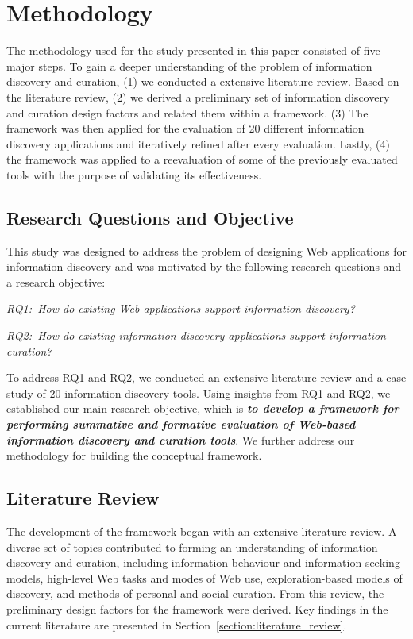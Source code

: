 \documentclass{sigchi}
\begin{document}
\section{Methodology}
\label{section:methodology}
The methodology used for the study presented in this paper consisted of five major steps. To gain a deeper understanding of the problem of information discovery and curation, (1) we conducted a extensive literature review. Based on the literature review, (2) we derived a preliminary set of information discovery and curation design factors and related them within a framework. (3) The framework was then applied for the evaluation of 20 different information discovery applications and iteratively refined after every evaluation. Lastly, (4) the framework was applied to a reevaluation of some of the previously evaluated tools with the purpose of validating its effectiveness. 

{\subsection{Research Questions and Objective}
This study was designed to address the problem of designing Web applications for information discovery and was motivated by the following research questions and a research objective:

\emph{RQ1:~How do existing Web applications support information discovery?}

\emph{RQ2:~How do existing information discovery applications support information curation?}

To address RQ1 and RQ2, we conducted an extensive literature review and a case study of 20 information discovery tools. Using insights from RQ1 and RQ2, we established our main research objective, which is \emph{\textbf{to develop a framework for performing summative and formative evaluation of Web-based information discovery and curation tools}}. We further address our methodology for building the conceptual framework.

}%

{\subsection{Literature Review}
\label{subsection:lit_review}
The development of the framework began with an extensive literature review. A diverse set of topics contributed to forming an understanding of information discovery and curation, including information behaviour and information seeking models, high-level Web tasks and modes of Web use, exploration-based models of discovery, and methods of personal and social curation. From this review, the preliminary design factors for the framework were derived. Key findings in the current literature are presented in Section~\ref{section:literature_review}.
}%
\end{document}
